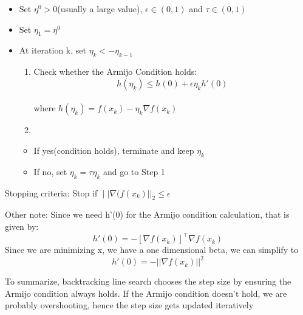 \documentclass[
  letterpaper,
  DIV=11,
  numbers=noendperiod]{scrartcl}
\providecommand{\tightlist}{%
  \setlength{\itemsep}{0pt}\setlength{\parskip}{0pt}}\usepackage{longtable,booktabs,array}
\begin{document}
\begin{itemize}
\tightlist
\item
  Set \(η^0 > 0\)(usually a large value), \(ϵ ∈ (0,1)\) and
  \(τ ∈ (0,1)\)
\item
  Set \(η_1 = η^0\)
\item
  At iteration k, set \(η_k <- η_{k-1}\)

  \begin{enumerate}
  \def\labelenumi{\arabic{enumi}.}
  \tightlist
  \item
    Check whether the Armijo Condition holds: \[
    h(η_k) ≤ h(0) + ϵη_kh'(0)
    \]\\
    where \(h(η_k) = f(x_k) − η_k ∇f(x_k)\)
  \item
  \end{enumerate}

  \begin{itemize}
  \tightlist
  \item
    If yes(condition holds), terminate and keep \(η_k\)
  \item
    If no, set \(η_k = τη_k\) and go to Step 1
  \end{itemize}
\end{itemize}

Stopping criteria: Stop if \(∣|∇(f(x_k)||_2 ≤ ϵ\)

Other note: Since we need h'(0) for the Armijo condition calculation,
that is given by:\\
\[
h'(0) = -[∇f(x_k)]^\top ∇f(x_k)
\] Since we are minimizing x, we have a one dimensional beta, we can
simplify to\\
\[
h'(0) = -||∇f(x_k)||^2
\]

To summarize, backtracking line search chooses the step size by ensuring
the Armijo condition always holds. If the Armijo condition doesn't hold,
we are probably overshooting, hence the step size gets updated
iteratively
\end{document}

